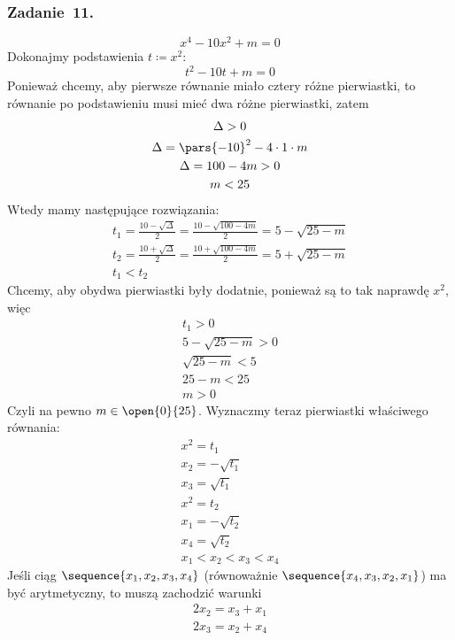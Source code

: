 \subsubsection*{Zadanie~11.}
\begin{equation*}
    x^4 - 10x^2 + m = 0
\end{equation*}
Dokonajmy podstawienia \(t \coloneqq x^2\):
\begin{equation*}
    t^2 - 10t + m = 0
\end{equation*}
Ponieważ chcemy, aby pierwsze równanie miało cztery różne pierwiastki, to równanie po podstawieniu musi mieć dwa różne pierwiastki, zatem
\begin{gather*}
    \Delta > 0\\
    \Delta = \pars{-10}^2 - 4 \cdot 1 \cdot m\\
    \Delta = 100 - 4m > 0\\
    m < 25
\end{gather*}
Wtedy mamy następujące rozwiązania:
\begin{gather*}
    t_1 = \frac{10 - \sqrt{\Delta}}{2} = \frac{10 - \sqrt{100 - 4m}}{2} = 5 - \sqrt{25 - m}\\
    t_2 = \frac{10 + \sqrt{\Delta}}{2} = \frac{10 + \sqrt{100 - 4m}}{2} = 5 + \sqrt{25 - m}\\
    t_1 < t_2
\end{gather*}
Chcemy, aby obydwa pierwiastki były dodatnie, ponieważ są to tak naprawdę \(x^2\), więc
\begin{gather*}
    t_1 > 0\\
    5 - \sqrt{25 - m} > 0\\
    \sqrt{25 - m} < 5\\
    25 - m < 25\\
    m > 0
\end{gather*}
Czyli na pewno \(m \in \open{0}{25}\). Wyznaczmy teraz pierwiastki właściwego równania:
\begin{gather*}
    x^2 = t_1\\
    x_2 = -\sqrt{t_1}\\
    x_3 = \sqrt{t_1}\\
    x^2 = t_2\\
    x_1 = -\sqrt{t_2}\\
    x_4 = \sqrt{t_2}\\
    x_1 < x_2 < x_3 < x_4
\end{gather*}
Jeśli ciąg \(\sequence{x_1, x_2, x_3, x_4}\) (równoważnie \(\sequence{x_4, x_3, x_2, x_1}\)) ma być arytmetyczny, to muszą zachodzić warunki
\begin{gather*}
    2x_2 = x_3 + x_1\\
    2x_3 = x_2 + x_4
\end{gather*}
